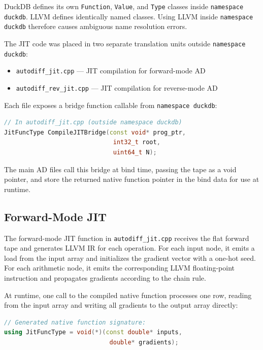 \documentclass[12pt]{report}
\begin{document}
DuckDB defines its own \texttt{Function}, \texttt{Value}, and \texttt{Type}
classes inside \texttt{namespace duckdb}. LLVM defines identically named
classes. Using LLVM inside \texttt{namespace duckdb} therefore causes
ambiguous name resolution errors.

The JIT code was placed in two separate translation units outside
\texttt{namespace duckdb}:

\begin{itemize}
    \item \texttt{autodiff\_jit.cpp} — JIT compilation for forward-mode AD
    \item \texttt{autodiff\_rev\_jit.cpp} — JIT compilation for reverse-mode AD
\end{itemize}

Each file exposes a bridge function callable from \texttt{namespace duckdb}:

\begin{lstlisting}[language=C++]
// In autodiff_jit.cpp (outside namespace duckdb)
JitFuncType CompileJITBridge(const void* prog_ptr,
                              int32_t root,
                              uint64_t N);
\end{lstlisting}

The main AD files call this bridge at bind time, passing the tape as a void
pointer, and store the returned native function pointer in the bind data for
use at runtime.

\subsection{Forward-Mode JIT}

The forward-mode JIT function in \texttt{autodiff\_jit.cpp} receives the flat
forward tape and generates LLVM IR for each operation. For each input node,
it emits a load from the input array and initializes the gradient vector with
a one-hot seed. For each arithmetic node, it emits the corresponding LLVM
floating-point instruction and propagates gradients according to the chain rule.

At runtime, one call to the compiled native function processes one row,
reading from the input array and writing all gradients to the output array
directly:

\begin{lstlisting}[language=C++]
// Generated native function signature:
using JitFuncType = void(*)(const double* inputs,
                             double* gradients);
\end{lstlisting}
\end{document}
